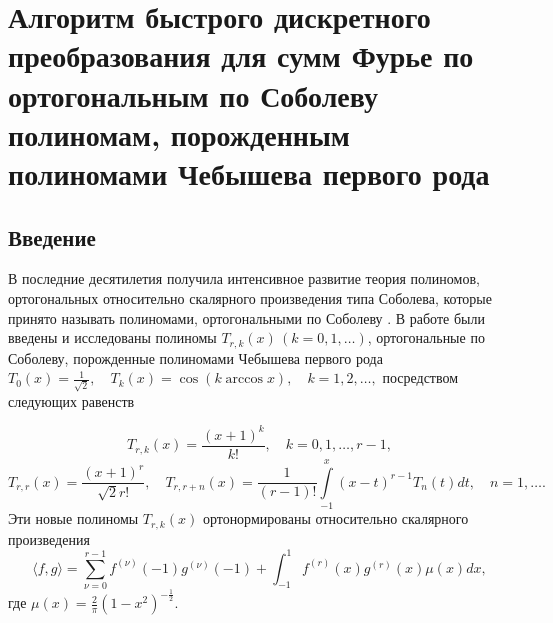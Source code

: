 \section{Алгоритм быстрого дискретного преобразования для сумм Фурье по ортогональным по Соболеву полиномам, порожденным полиномами Чебышева первого рода}

\subsection{Введение}

В последние десятилетия получила интенсивное развитие теория полиномов, ортогональных относительно скалярного произведения типа Соболева, которые принято называть полиномами, ортогональными  по Соболеву \cite{sms-stn-1-MarcelXu,sms-stn-1-SharIzVuz}. В работе \cite{sms-stn-1-SharIzVuz} были введены и исследованы полиномы $T_{r,k}(x)\,(k=0,1,\ldots)$, ортогональные по Соболеву, порожденные полиномами Чебышева первого рода
$T_0(x)=\frac{1}{\sqrt{2}},\quad T_k(x)=\cos(k\arccos x), \quad k=1,2,\ldots,$
посредством следующих равенств

\begin{equation}\label{sms-stn-1-sobcheb3}
T_{r,k}(x) =\frac{(x+1)^k}{k!}, \quad k=0,1,\ldots, r-1,
\end{equation}
\begin{equation}\label{sms-stn-1-sobcheb4}
T_{r,r}(x) =\frac{(x+1)^r}{\sqrt{2}r!},\quad T_{r,r+n}(x) =\frac{1}{(r-1)!}\int\limits_{-1}^x(x-t)^{r-1}T_{n}(t)dt, \quad n=1,\ldots.
\end{equation}
Эти новые полиномы $T_{r,k}(x)$ ортонормированы \cite{sms-stn-1-SharIzVuz} относительно скалярного произведения
\begin{equation}\label{sms-stn-1-sobcheb2}
\langle f,g\rangle=\sum_{\nu=0}^{r-1}f^{(\nu)}(-1)g^{(\nu)}(-1)+\int_{-1}^{1}f^{(r)}(x)g^{(r)}(x)\mu(x)dx,
\end{equation}
где $\mu(x)=\frac2\pi(1-x^2)^{-\frac12}$.

